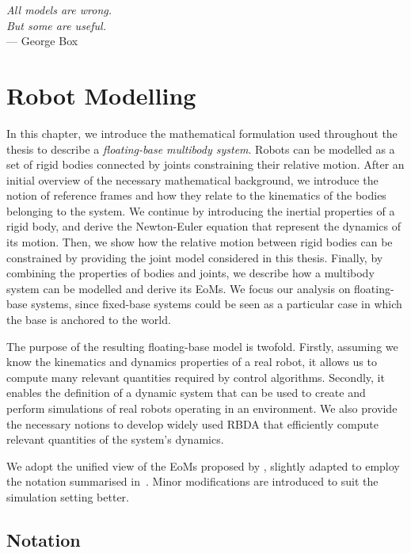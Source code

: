 \begin{flushright}
    \textsl{
    All models are wrong.\\
    But some are useful.
    }\\
    --- {George Box}
\end{flushright}

\chapter{Robot Modelling}
\label{ch:robot_modelling}

In this chapter, we introduce the mathematical formulation used throughout the thesis to describe a \emph{floating-base multibody system}.
Robots can be modelled as a set of rigid bodies connected by joints constraining their relative motion.
After an initial overview of the necessary mathematical background, we introduce the notion of reference frames and how they relate to the kinematics of the bodies belonging to the system.
We continue by introducing the inertial properties of a rigid body, and derive the Newton-Euler equation that represent the dynamics of its motion.
Then, we show how the relative motion between rigid bodies can be constrained by providing the joint model considered in this thesis.
Finally, by combining the properties of bodies and joints, we describe how a multibody system can be modelled and derive its \aclp{EoM}.
We focus our analysis on floating-base systems, since fixed-base systems could be seen as a particular case in which the base is anchored to the world.

The purpose of the resulting floating-base model is twofold.
Firstly, assuming we know the kinematics and dynamics properties of a real robot, it allows us to compute many relevant quantities required by control algorithms.
Secondly, it enables the definition of a dynamic system that can be used to create and perform simulations of real robots operating in an environment.
We also provide the necessary notions to develop widely used \ac{RBDA} that efficiently compute relevant quantities of the system's dynamics.

We adopt the unified view of the \acp{EoM} proposed by \textcite{traversaro_unied_2017}, slightly adapted to employ the notation summarised in~\textcite{traversaro_multibody_2019}.
Minor modifications are introduced to suit the simulation setting better.

\section{Notation}

